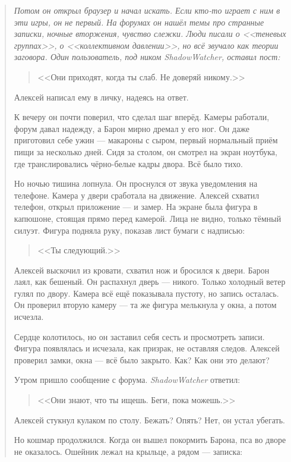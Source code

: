 \documentclass[12pt,a4paper]{book}
\newenvironment{dialogue}{\begin{quote}\itshape}{\end{quote}}
\begin{document}
\begin{dialogue}
Потом он открыл браузер и начал искать. Если кто-то играет с ним в эти игры, он не первый. На форумах он нашёл темы про странные записки, ночные вторжения, чувство слежки. Люди писали о <<теневых группах>>, о <<коллективном давлении>>, но всё звучало как теории заговора. Один пользователь, под ником \textit{ShadowWatcher}, оставил пост:

\begin{quote}
<<Они приходят, когда ты слаб. Не доверяй никому.>>
\end{quote}

Алексей написал ему в личку, надеясь на ответ.

К вечеру он почти поверил, что сделал шаг вперёд. Камеры работали, форум давал надежду, а Барон мирно дремал у его ног. Он даже приготовил себе ужин --- макароны с сыром, первый нормальный приём пищи за несколько дней. Сидя за столом, он смотрел на экран ноутбука, где транслировались чёрно-белые кадры двора. Всё было тихо.

Но ночью тишина лопнула. Он проснулся от звука уведомления на телефоне. Камера у двери сработала на движение. Алексей схватил телефон, открыл приложение --- и замер. На экране была фигура в капюшоне, стоящая прямо перед камерой. Лица не видно, только тёмный силуэт. Фигура подняла руку, показав лист бумаги с надписью:

\begin{quote}
<<Ты следующий.>>
\end{quote}

Алексей выскочил из кровати, схватил нож и бросился к двери. Барон лаял, как бешеный. Он распахнул дверь --- никого. Только холодный ветер гулял по двору. Камера всё ещё показывала пустоту, но запись осталась. Он проверил вторую камеру --- та же фигура мелькнула у окна, а потом исчезла.

Сердце колотилось, но он заставил себя сесть и просмотреть записи. Фигура появлялась и исчезала, как призрак, не оставляя следов. Алексей проверил замки, окна --- всё было закрыто. Как? Как они это делают?

Утром пришло сообщение с форума. \textit{ShadowWatcher} ответил:

\begin{quote}
<<Они знают, что ты ищешь. Беги, пока можешь.>>
\end{quote}

Алексей стукнул кулаком по столу. Бежать? Опять? Нет, он устал убегать.

Но кошмар продолжился. Когда он вышел покормить Барона, пса во дворе не оказалось. Ошейник лежал на крыльце, а рядом --- записка:


\end{dialogue}
\end{document}
